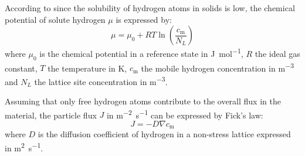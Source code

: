 According to  since the solubility of hydrogen atoms in solids is low, the chemical potential of solute hydrogen $\mu$ is expressed by:
\begin{equation}
    \mu = \mu_0 + RT \ln\left( \frac{c_\mathrm{m}}{N_L}\right)
\end{equation}
where $\mu_0$ is the chemical potential in a reference state in \si{J.mol^{-1}}, $R$ the ideal gas constant, $T$ the temperature in \si{K}, $c_\mathrm{m}$ the mobile hydrogen concentration in \si{m^{-3}} and $N_L$ the lattice site concentration in \si{m^{-3}}.

Assuming that only free hydrogen atoms contribute to the overall flux in the material, the particle flux $J$ in \si{m^{-2}.s^{-1}} can be expressed by Fick's law:
\begin{equation}
    J = - D \nabla c_\mathrm{m}
\end{equation}
where $D$ is the diffusion coefficient of hydrogen in a non-stress lattice expressed in \si{m^{2}.s^{-1}}. 






